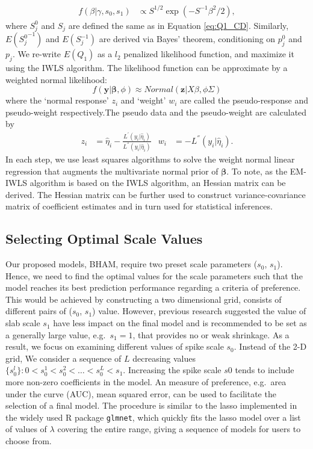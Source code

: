 \documentclass[AMA,STIX1COL,]{WileyNJD-v2}
\begin{document}
\[
\begin{aligned}
f( \beta | \gamma, s_0, s_1) &\propto S^{1/2} \exp(-S^{-1} \beta^2/2),
\end{aligned}
\] where \(S_{j}^0\) and \(S_{j}\) are defined the same as in Equation
\ref{eq:Q1_CD}. Similarly, \(E({S_j^0}^{-1})\) and \(E(S^{-1}_j)\) are
derived via Bayes' theorem, conditioning on \(p^0_j\) and \(p_j\). We
re-write \(E(Q_1)\) as a \(l_2\) penalized likelihood function, and
maximize it using the IWLS algorithm. The likelihood function can be
approximate by a weighted normal likelihood: \[
  f(\textbf{y}|\boldsymbol{\beta}, \phi) \approx Normal(\textbf{z}|X\beta, \phi\Sigma)
\] where the `normal response' \(z_i\) and `weight' \(w_i\) are called
the pseudo-response and pseudo-weight respectively.The pseudo data and
the pseudo-weight are calculated by \[
\begin{aligned}
z_i &= \hat\eta_i - \frac{L^{'}(y_i|\hat\eta_i)}{L^{''}(y_i|\hat\eta_i)}& w_i &= - L^{''}(y_i|\hat\eta_i).
\end{aligned}
\] In each step, we use least squares algorithms to solve the weight
normal linear regression that augments the multivariate normal prior of
\(\boldsymbol{\beta}\). To note, as the EM-IWLS algorithm is based on
the IWLS algorithm, an Hessian matrix can be derived. The Hessian matrix
can be further used to construct variance-covariance matrix of
coefficient estimates and in turn used for statistical inferences.

\hypertarget{selecting-optimal-scale-values}{%
\subsection{Selecting Optimal Scale
Values}\label{selecting-optimal-scale-values}}

\label{sec:tune} Our proposed models, BHAM, require two preset scale
parameters (\(s_0\), \(s_1\)). Hence, we need to find the optimal values
for the scale parameters such that the model reaches its best prediction
performance regarding a criteria of preference. This would be achieved
by constructing a two dimensional grid, consists of different pairs of
(\(s_0\), \(s_1\)) value. However, previous research suggested the value
of slab scale \(s_1\) have less impact on the final model and is
recommended to be set as a generally large value, e.g.~\(s_1 = 1\), that
provides no or weak shrinkage. \citep{Rockova2018} As a result, we focus
on examining different values of spike scale \(s_0\). Instead of the 2-D
grid, We consider a sequence of \(L\) decreasing values
\(\{s_0^l\}: 0 < s_0^1 < s_0^2 < \dots < s_0^L < s_1\). Increasing the
spike scale \(s0\) tends to include more non-zero coefficients in the
model. An measure of preference, e.g.~area under the curve (AUC), mean
squared error, can be used to facilitate the selection of a final model.
The procedure is similar to the lasso implemented in the widely used R
package \texttt{glmnet}, which quickly fits the lasso model over a list
of values of \(\lambda\) covering the entire range, giving a sequence of
models for users to choose from.
\end{document}

